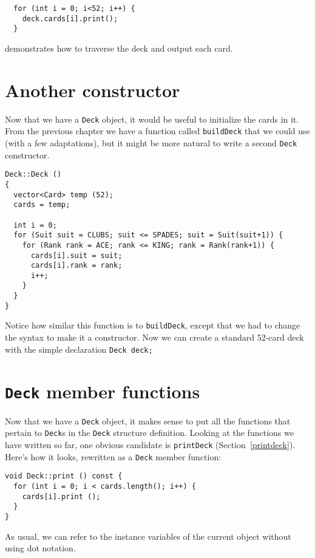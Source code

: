 \begin{verbatim}
  for (int i = 0; i<52; i++) {
    deck.cards[i].print();
  }
\end{verbatim}
%
demonstrates how to traverse the deck and output each card.

\section {Another constructor}

Now that we have a {\tt Deck} object, it would be useful
to initialize the cards in it.  From the previous chapter we
have a function called {\tt buildDeck} that we could use
(with a few adaptations), but it might be more natural to
write a second {\tt Deck} constructor.


\begin{verbatim}
Deck::Deck ()
{
  vector<Card> temp (52);
  cards = temp;

  int i = 0;
  for (Suit suit = CLUBS; suit <= SPADES; suit = Suit(suit+1)) {
    for (Rank rank = ACE; rank <= KING; rank = Rank(rank+1)) {
      cards[i].suit = suit;
      cards[i].rank = rank;
      i++;
    }
  }
}
\end{verbatim}
%
Notice how similar this function is to {\tt buildDeck}, except
that we had to change the syntax to make it a constructor.
Now we can create a standard 52-card deck with the simple
declaration {\tt Deck deck;}

\section {{\tt Deck} member functions}

Now that we have a {\tt Deck} object, it makes sense to put
all the functions that pertain to {\tt Deck}s in the {\tt Deck}
structure definition.  Looking at the functions we have written so
far, one obvious candidate is {\tt printDeck} (Section~\ref{printdeck}).
Here's how it looks, rewritten as a {\tt Deck} member function:


\begin{verbatim}
void Deck::print () const {
  for (int i = 0; i < cards.length(); i++) {
    cards[i].print ();
  }
}
\end{verbatim}
%
As usual, we can refer to the instance variables of the current
object without using dot notation.

